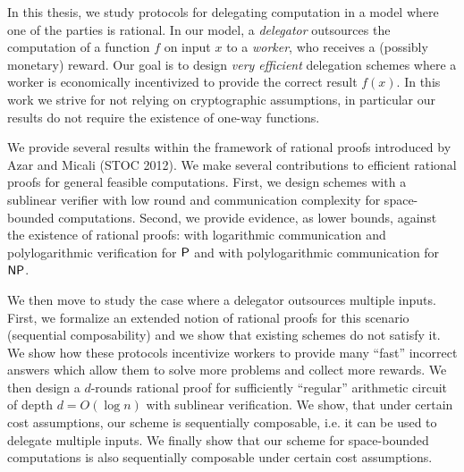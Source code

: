 % 
% 
%
	\noindent
	In this thesis, we study protocols for delegating computation in a model where one of the parties is rational. In our model, a \textit{delegator} outsources the computation of a function $f$ on input $x$ to a \textit{worker}, who
	receives a (possibly monetary) reward. Our goal is to design \textit{very efficient} delegation schemes 
	where a worker is economically incentivized to provide the correct result
	$f(x)$. In this work we strive for not relying on cryptographic assumptions, in particular our results do not require the existence of one-way functions. 
	
	We provide several results within the framework of rational proofs introduced by Azar and Micali (STOC 2012).
	We make several contributions to efficient rational proofs for general feasible computations.
	First, we design schemes with a sublinear verifier with low round and communication complexity for
	space-bounded computations.
	Second, we provide evidence, as lower bounds, against the existence of rational proofs:
	with logarithmic communication and polylogarithmic verification for $\P$ and 
	with polylogarithmic communication for $\NP$.
	
	We then move to study the case where a delegator outsources multiple inputs.
	First, we formalize an extended notion of rational proofs for this scenario (sequential composability) and we
	show that existing schemes do not satisfy it. We show how these protocols incentivize workers
	to provide many ``fast'' incorrect answers which allow them to solve more problems and collect more rewards.
	We then design a $d$-rounds rational proof for sufficiently ``regular'' arithmetic circuit of depth $d = O(\log{n})$
	with sublinear verification. We show, that under certain cost assumptions, our scheme is sequentially composable,
	i.e. it can be used to delegate multiple inputs. We finally show that our scheme for space-bounded computations is also 
	sequentially composable under certain cost assumptions.
	
